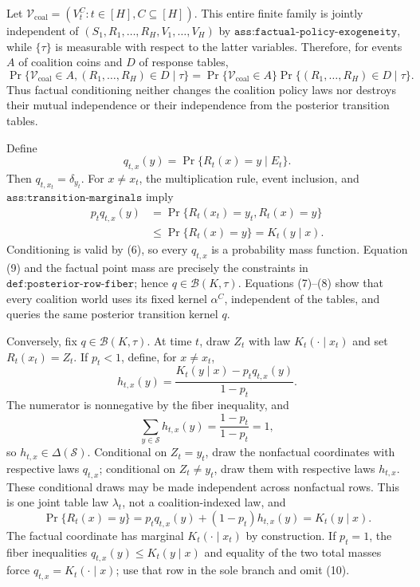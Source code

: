 Let \(\mathscr V_{\mathrm{coal}}=(V_t^C:t\in[H],C\subseteq[H])\).  This entire finite family is jointly independent of \((S_1,R_1,\ldots,R_H,V_1,\ldots,V_H)\) by \(\texttt{ass:factual-policy-exogeneity}\), while \(\{\tau\}\) is measurable with respect to the latter variables.  Therefore, for events \(A\) of coalition coins and \(D\) of response tables,
\[
 \Pr\{\mathscr V_{\mathrm{coal}}\in A,(R_1,\ldots,R_H)\in D\mid\tau\}
 =\Pr\{\mathscr V_{\mathrm{coal}}\in A\}\Pr\{(R_1,\ldots,R_H)\in D\mid\tau\}. \tag{8}
\]
Thus factual conditioning neither changes the coalition policy laws nor destroys their mutual independence or their independence from the posterior transition tables.

Define
\[
 q_{t,x}(y)=\Pr\{R_t(x)=y\mid E_t\}.
\]
Then \(q_{t,x_t}=\delta_{y_t}\).  For \(x\ne x_t\), the multiplication rule, event inclusion, and \(\texttt{ass:transition-marginals}\) imply
\[
 \begin{aligned}
 p_tq_{t,x}(y)
 &=\Pr\{R_t(x_t)=y_t,R_t(x)=y\}\\
 &\le \Pr\{R_t(x)=y\}=K_t(y\mid x).
 \end{aligned} \tag{9}
\]
Conditioning is valid by (6), so every \(q_{t,x}\) is a probability mass function.  Equation (9) and the factual point mass are precisely the constraints in \(\texttt{def:posterior-row-fiber}\); hence \(q\in\mathcal B(K,\tau)\).  Equations (7)--(8) show that every coalition world uses its fixed kernel \(\alpha^C\), independent of the tables, and queries the same posterior transition kernel \(q\).

Conversely, fix \(q\in\mathcal B(K,\tau)\).  At time \(t\), draw \(Z_t\) with law \(K_t(\cdot\mid x_t)\) and set \(R_t(x_t)=Z_t\).  If \(p_t<1\), define, for \(x\ne x_t\),
\[
 h_{t,x}(y)=\frac{K_t(y\mid x)-p_tq_{t,x}(y)}{1-p_t}. \tag{10}
\]
The numerator is nonnegative by the fiber inequality, and
\[
 \sum_{y\in\mathcal S}h_{t,x}(y)=\frac{1-p_t}{1-p_t}=1, \tag{11}
\]
so \(h_{t,x}\in\Delta(\mathcal S)\).  Conditional on \(Z_t=y_t\), draw the nonfactual coordinates with respective laws \(q_{t,x}\); conditional on \(Z_t\ne y_t\), draw them with respective laws \(h_{t,x}\).  These conditional draws may be made independent across nonfactual rows.  This is one joint table law \(\lambda_t\), not a coalition-indexed law, and
\[
 \Pr\{R_t(x)=y\}=p_tq_{t,x}(y)+(1-p_t)h_{t,x}(y)=K_t(y\mid x). \tag{12}
\]
The factual coordinate has marginal \(K_t(\cdot\mid x_t)\) by construction.  If \(p_t=1\), the fiber inequalities \(q_{t,x}(y)\le K_t(y\mid x)\) and equality of the two total masses force \(q_{t,x}=K_t(\cdot\mid x)\); use that row in the sole branch and omit (10).

